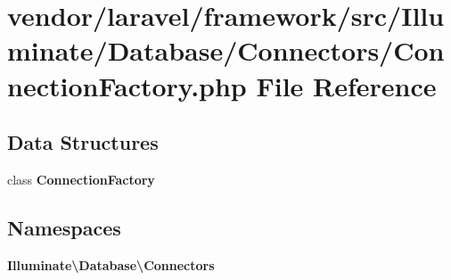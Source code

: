 \section{vendor/laravel/framework/src/\+Illuminate/\+Database/\+Connectors/\+Connection\+Factory.php File Reference}
\label{_connection_factory_8php}
\subsection*{Data Structures}
\begin{DoxyCompactItemize}
\item 
class {\bf Connection\+Factory}
\end{DoxyCompactItemize}
\subsection*{Namespaces}
\begin{DoxyCompactItemize}
\item 
 {\bf Illuminate\textbackslash{}\+Database\textbackslash{}\+Connectors}
\end{DoxyCompactItemize}
